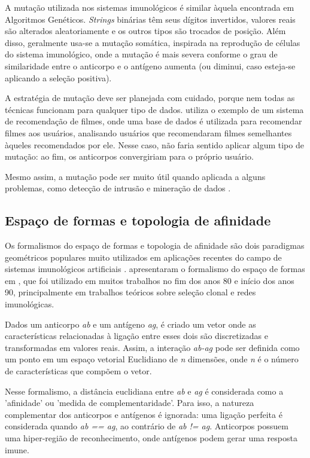 A mutação utilizada nos sistemas imunológicos é similar àquela encontrada em Algoritmos Genéticos. \emph{Strings} binárias têm seus dígitos invertidos, valores reais são alterados aleatoriamente e os outros tipos são trocados de posição. Além disso, geralmente usa-se a mutação somática, inspirada na reprodução de células do sistema imunológico, onde a mutação é mais severa conforme o grau de similaridade entre o anticorpo e o antígeno aumenta (ou diminui, caso esteja-se aplicando a seleção positiva). 

A estratégia de mutação deve ser planejada com cuidado, porque nem todas as técnicas funcionam para qualquer tipo de dados. \citet{Aickelin2005} utiliza o exemplo de um sistema de recomendação de filmes, onde uma base de dados é utilizada para recomendar filmes aos usuários, analisando usuários que recomendaram filmes semelhantes àqueles recomendados por ele. Nesse caso, não faria sentido aplicar algum tipo de mutação: ao fim, os anticorpos convergiriam para o próprio usuário.

Mesmo assim, a mutação pode ser muito útil quando aplicada a alguns problemas, como detecção de intrusão e mineração de dados \cite{DeCastro2002}. 

\subsection{Espaço de formas e topologia de afinidade}

Os formalismos do espaço de formas e topologia de afinidade são dois paradigmas geométricos populares muito utilizados em aplicações recentes do campo de sistemas imunológicos artificiais \cite{Brownlee2007}. \citeauthor{Perlson1979} apresentaram o formalismo do espaço de formas em \citet{Perlson1979}, que foi utilizado em muitos trabalhos no fim dos anos 80 e início dos anos 90, principalmente em trabalhos teóricos sobre seleção clonal e redes imunológicas.

Dados um anticorpo \emph{ab} e um antígeno \emph{ag}, é criado um vetor onde as características relacionadas à ligação entre esses dois são discretizadas e transformadas em valores reais. Assim, a interação \emph{ab-ag} pode ser definida como um ponto em um espaço vetorial Euclidiano de \emph{n} dimensões, onde \emph{n} é o número de características que compõem o vetor.

Nesse formalismo, a distância euclidiana entre \emph{ab} e \emph{ag} é considerada como a 'afinidade' ou 'medida de complementaridade'. Para isso, a natureza complementar dos anticorpos e antígenos é ignorada: uma ligação perfeita é considerada quando \emph{ab == ag}, ao contrário de \emph{ab != ag}. Anticorpos possuem uma hiper-região de reconhecimento, onde antígenos podem gerar uma resposta imune.

